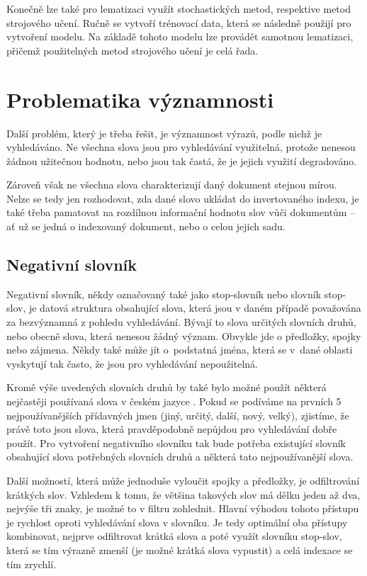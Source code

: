 \documentclass[FM,DP]{tulthesis}
\begin{document}
Konečně lze také pro lematizaci využít stochastických metod, respektive metod strojového
učení. Ručně se vytvoří trénovací data, která se následně použijí pro vytvoření modelu.
Na základě tohoto modelu lze provádět samotnou lematizaci, přičemž použitelných metod 
strojového učení je celá řada.

\section{Problematika významnosti}

Další problém, který je třeba řešit, je významnost výrazů, podle nichž je vyhledáváno.
Ne všechna slova jsou pro vyhledávání využitelná, protože nenesou žádnou užitečnou 
hodnotu, nebo jsou tak častá, že je jejich využití degradováno. 

Zároveň však ne všechna slova charakterizují daný dokument stejnou mírou. Nelze se tedy 
jen rozhodovat, zda dané slovo ukládat do invertovaného indexu, je také třeba pamatovat
na rozdílnou informační hodnotu slov vůči dokumentům -- ať už se jedná o indexovaný
dokument, nebo o celou jejich sadu.

\subsection{Negativní slovník}

Negativní slovník, někdy označovaný také jako stop-slovník nebo slovník stop-slov, 
je datová struktura obsahující slova, která jsou v daném případě považována za bezvýznamná
z pohledu vyhledávání. Bývají to slova určitých slovních druhů, nebo obecně slova, která 
nenesou žádný význam. Obvykle jde o předložky, spojky nebo zájmena. Někdy také může jít 
o~podstatná jména, která se v~dané oblasti vyskytují tak často, že jsou pro vyhledávání nepoužitelná.

Kromě výše uvedených slovních druhů by také bylo možné použít některá nejčastěji používaná
slova v českém jazyce \cite{nejpouzivanejsi-slova} . Pokud se podíváme na prvních 5 nejpoužívanějších 
přídavných jmen (jiný, určitý, další, nový, velký), zjistíme, že právě toto jsou slova, 
která pravděpodobně nepůjdou pro vyhledávání dobře použít. Pro vytvoření negativního slovníku 
tak bude potřeba existující slovník obsahující slova potřebných slovních druhů a některá tato 
nejpoužívanější slova.

Další možností, která může jednoduše vyloučit spojky a předložky, je odfiltrování krátkých
slov. Vzhledem k tomu, že většina takových slov má dělku jeden až dva, nejvýše tři znaky, 
je možné to v filtru zohlednit. Hlavní výhodou tohoto přístupu je rychlost oproti vyhledávání
slova v slovníku. Je tedy optimální oba přístupy kombinovat, nejprve odfiltrovat krátká slova
a poté využít slovníku stop-slov, která se tím výrazně zmenší (je možné krátká slova vypustit)
a celá indexace se tím zrychlí.
\end{document}
